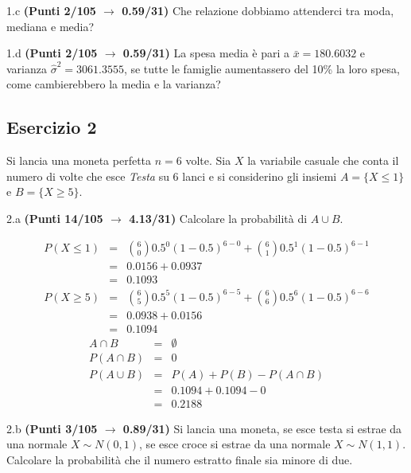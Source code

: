 \documentclass[
  11pt,
]{book}
\theoremstyle{mytheoremstyle}
\theoremstyle{mydefstyle}
\newenvironment{sol}
  {
  \begin{tcolorbox}[enhanced,breakable,arc=0.1mm,boxrule=1pt,colback=white,colframe=iblue,
  title=\bf \fontfamily{lmss}\selectfont \hspace{.5 cm} Soluzione,drop fuzzy shadow]

}{
\end{tcolorbox}
  }
\begin{document}
1.c \textbf{(Punti 2/105 \(\rightarrow\) 0.59/31)} Che relazione dobbiamo attenderci tra moda, mediana e media?

1.d \textbf{(Punti 2/105 \(\rightarrow\) 0.59/31)} La spesa media è pari a \(\bar x=180.6032\) e varianza \(\hat\sigma^2=3061.3555\), se tutte le famiglie aumentassero
del 10\% la loro spesa, come cambierebbero la media e la varianza?

\subsection{Esercizio 2}\label{esercizio-2-29}

Si lancia una moneta perfetta \(n=6\) volte. Sia \(X\) la variabile casuale che conta
il numero di volte che esce \emph{Testa} su 6 lanci e si considerino gli insiemi \(A=\{X\le 1\}\) e \(B=\{X\ge 5\}\).

2.a \textbf{(Punti 14/105 \(\rightarrow\) 4.13/31)} Calcolare la probabilità di \(A\cup B\).

\begin{sol}
\normalsize 
\begin{eqnarray*}
      P( X \leq 1 ) &=& \binom{ 6 }{ 0 } 0.5 ^{ 0 }(1- 0.5 )^{ 6 - 0 }+\binom{ 6 }{ 1 } 0.5 ^{ 1 }(1- 0.5 )^{ 6 - 1 } \\                 &=& 0.0156+0.0937 \\                 &=& 0.1093 
   \end{eqnarray*}
\normalsize  \normalsize 
\begin{eqnarray*}
      P( X \geq 5 ) &=& \binom{ 6 }{ 5 } 0.5 ^{ 5 }(1- 0.5 )^{ 6 - 5 }+\binom{ 6 }{ 6 } 0.5 ^{ 6 }(1- 0.5 )^{ 6 - 6 } \\                 &=& 0.0938+0.0156 \\                 &=& 0.1094 
   \end{eqnarray*}
\normalsize 
\begin{eqnarray*}
A\cap B &=& \emptyset\\
P(A\cap B) &=& 0\\
  P(A\cup B) &=&  P(A)+P(B)-P(A\cap B)\\
  &=& 0.1094+0.1094-0\\
  &=& 0.2188
\end{eqnarray*}

\end{sol}

2.b \textbf{(Punti 3/105 \(\rightarrow\) 0.89/31)} Si lancia una moneta, se esce testa si estrae da una normale \(X\sim N(0,1)\), se esce croce si estrae
da una normale \(X\sim N(1,1)\). Calcolare la probabilità che il numero estratto finale sia minore di due.
\end{document}
